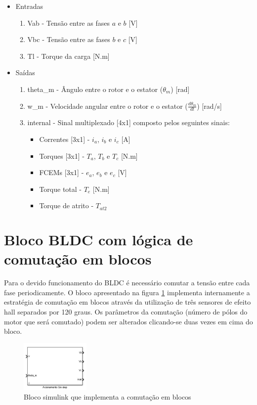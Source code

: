         \begin{itemize}
            \item Entradas
            \begin{enumerate}
                \item Vab - Tensão entre as fases $a$ e $b$ [V]
                \item Vbc - Tensão entre as fases $b$ e $c$ [V]
                \item Tl - Torque da carga [N.m]
            \end{enumerate}
            \item Saídas
            \begin{enumerate}
                \item theta\_m - Ângulo entre o rotor e o estator ($\theta_m$) [rad]
                \item w\_m - Velocidade angular entre o rotor e o estator ($\frac{d\theta_m}{dt}$) [rad/s]
                \item internal - Sinal multiplexado [4x1] composto pelos seguintes sinais:
                \begin{itemize}
                    \item Correntes [3x1] - $i_a$, $i_b$ e $i_c$ [A]
                    \item Torques [3x1] - $T_a$, $T_b$ e $T_c$ [N.m]
                    \item FCEMs [3x1] - $e_a$, $e_b$ e $e_c$ [V]
                    \item Torque total - $T_e$ [N.m]
                    \item Torque de atrito - $T_{at2}$
                \end{itemize}
            \end{enumerate}
        \end{itemize}

    \section{Bloco BLDC com lógica de comutação em blocos}
        Para o devido funcionamento do BLDC é necessário comutar a tensão entre cada fase periodicamente. O bloco apresentado na figura \ref{fig:bloco_BLDC_block_commutation} implementa internamente a estratégia de comutação em blocos através da utilização de três sensores de efeito hall separados por 120 graus. Os parâmetros da comutação (número de pólos do motor que será comutado) podem ser alterados clicando-se duas vezes em cima do bloco.
        \begin{figure}[ht]
            \centering
            \includegraphics[width=0.3\textwidth]{bloco_acionamento_six_step}
            \caption{Bloco simulink que implementa a comutação em blocos}
            \label{fig:bloco_BLDC_block_commutation}
        \end{figure}

